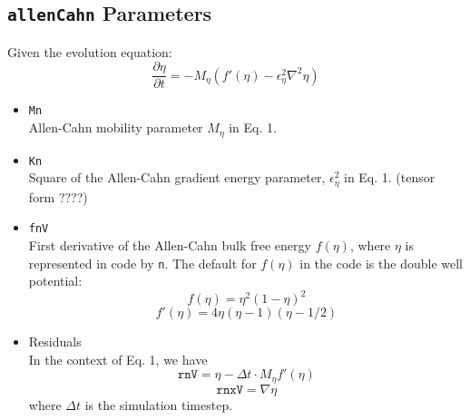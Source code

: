 \documentclass[11pt]{article} %
\begin{document}
\subsection{\texttt{allenCahn} Parameters}
Given the evolution equation:
\begin{equation}
\frac{\partial \eta}{\partial t} = -M_\eta \left( f'(\eta) - \epsilon_\eta^2 \nabla^2 \eta \right)
\end{equation}
\begin{itemize}
\item \texttt{Mn} \\
	Allen-Cahn mobility parameter $M_\eta$ in Eq. 1.
\item \texttt{Kn} \\
	Square of the Allen-Cahn gradient energy parameter, $\epsilon_\eta^2$ in Eq. 1.  (tensor form ????)
\item \texttt{fnV} \\
	First derivative of the Allen-Cahn bulk free energy $f(\eta)$, where $\eta$ is represented in code by \texttt{n}.  The default for $f(\eta)$ in the code is the 		double well potential:
	\begin{equation} f(\eta) = \eta^2 (1-\eta)^2 \end{equation}
	\[ f'(\eta) = 4\eta (\eta -1)(\eta - 1/2) \]
\item Residuals \\
	In the context of Eq. 1, we have
	\[ \texttt{rnV} = \eta - \Delta t \cdot M_\eta f'(\eta) \]
	\[ \texttt{rnxV} = \nabla \eta \]
	 where $\Delta t$ is the simulation timestep.
\end{itemize}

\end{document}

